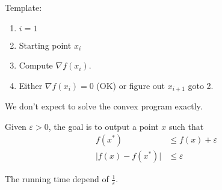 Template:
\begin{enumerate}
    \item $i=1$
    \item Starting point $x_i$
    \item Compute $\nabla f(x_i)$.
    \item Either $\nabla f(x_i) = 0$ (OK) or figure out $x_{i+1}$ goto 2.
\end{enumerate}

We don't expect to solve the convex program exactly.

Given $\varepsilon > 0$, the goal is to output a point $x$ such that
\[
    \begin{aligned}
	    f(x^*) &\leqslant f(x)  + \varepsilon\\
	    \lvert f(x)-f(x^*)\rvert &\leqslant \varepsilon
    \end{aligned}
\]

The running time depend of $\frac{1}{\varepsilon}$.